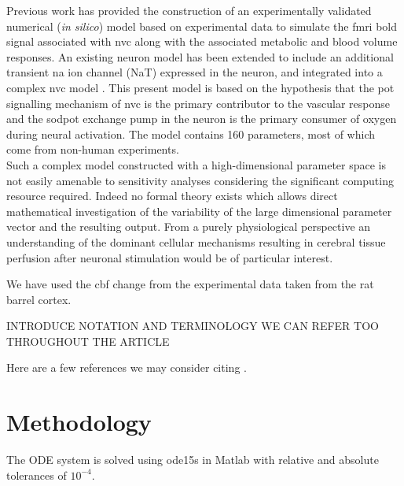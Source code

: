 \documentclass[12pt]{article}
\numberwithin{equation}{section}
\begin{document}
Previous work \cite{Mathias2018} has provided  the construction of an experimentally validated numerical (\textit{in silico}) model based on experimental data to simulate the \gls{fmri} \gls{bold} signal associated with \gls{nvc} along with the associated metabolic and blood volume responses. An existing neuron model \citep{Mathias2017, Mathias2017a} has been extended to include an additional transient \gls{na} ion channel (NaT) expressed in the neuron, and integrated into a complex \gls{nvc} model \citep{Dormanns2015, Dormanns2016, Kenny2017a}. This present model is based on the hypothesis that the \gls{pot} signalling mechanism of \gls{nvc} is the primary contributor to the vascular response and the \gls{sodpot} exchange pump in the neuron is the primary consumer of oxygen during neural activation. The model contains 160 parameters, most of which come from non-human experiments. \\
Such a complex model constructed with a high-dimensional parameter space is not easily amenable to sensitivity analyses considering the significant computing resource required. Indeed no formal theory exists which allows direct mathematical investigation of the variability of the large dimensional parameter vector and the resulting output. 
From a purely physiological perspective an understanding of the dominant cellular mechanisms resulting in cerebral tissue perfusion after neuronal stimulation would be of particular interest.
  
  We have used the \gls{cbf} change from the experimental data \cite{Zheng2010} taken from the rat barrel cortex. 
  
 INTRODUCE NOTATION AND TERMINOLOGY WE CAN REFER TOO THROUGHOUT THE ARTICLE
  
Here are a few references we may consider citing  \cite{gsa_pharm,lr_gsa,uqpy,Witthoft2013}.
  
\section{Methodology}
The ODE system is solved using ode15s in Matlab with relative and absolute tolerances of $10^{-4}$.
\end{document}
